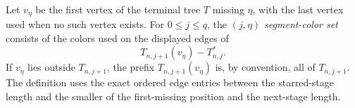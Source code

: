 \begin{definition}
Let $v_\eta$ be the first vertex of the terminal tree $T$ missing
$\eta$, with the last vertex used when no such vertex exists.  For
$0\leq j\leq q$, the \emph{$(j,\eta)$ segment-color set} consists of
the colors used on the displayed edges of
\[
 T_{n,j+1}(v_\eta)-T_{n,j}^{*}.
\]
If $v_\eta$ lies outside $T_{n,j+1}$, the prefix
$T_{n,j+1}(v_\eta)$ is, by convention, all of $T_{n,j+1}$.  The
definition uses the exact ordered edge entries between the starred-stage
length and the smaller of the first-missing position and the next-stage
length.
\end{definition}
